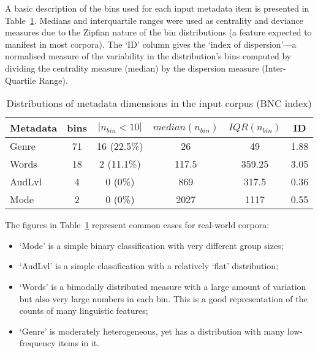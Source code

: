 A basic description of the bins used for each input metadata item is presented in Table~\ref{table:evaluation:resampling:inputdist}.  Medians and interquartile ranges were used as centrality and deviance measures due to the Zipfian nature of the bin distributions (a feature expected to manifest in most corpora).  The `ID' column gives the `index of dispersion'---a normalised measure of the variability in the distribution's bins computed by dividing the centrality measure (median) by the dispersion measure (Inter-Quartile Range).

\begin{table}[ht]
    \centering

    \begin{tabular}{|l|c|c|c|c|c|}
        \hline
        Metadata & bins & $|n_{bin} < 10|$ & $median(n_{bin})$ & $IQR(n_{bin})$ & ID  \\
        \hline
        Genre & 71  & 16 (22.5\%)   & 26    & 49        & 1.88    \\
        Words & 18  & 2 (11.1\%)    & 117.5 & 359.25    & 3.05    \\
        AudLvl& 4   & 0 (0\%)       & 869   & 317.5     & 0.36    \\
        Mode  & 2   & 0 (0\%)       & 2027  & 1117      & 0.55    \\
        \hline
    \end{tabular}
    \caption{Distributions of metadata dimensions in the input corpus (BNC index)}
    \label{table:evaluation:resampling:inputdist}
\end{table}

The figures in Table~\ref{table:evaluation:resampling:inputdist} represent common cases for real-world corpora:

\begin{itemize}
    \item `Mode' is a simple binary classification with very different group sizes;
    \item `AudLvl' is a simple classification with a relatively `flat' distribution;
    \item `Words' is a bimodally distributed measure with a large amount of variation but also very large numbers in each bin.  This is a good representation of the counts of many linguistic features;
    \item `Genre' is moderately heterogeneous, yet has a distribution with many low-frequency items in it.
\end{itemize}

